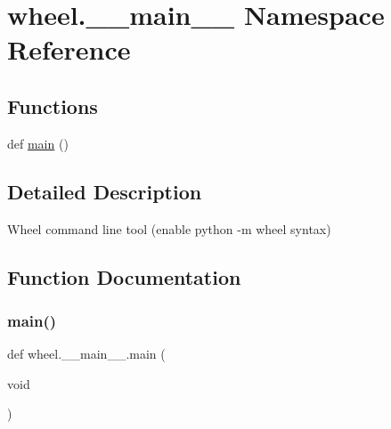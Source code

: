 \hypertarget{namespacewheel_1_1____main____}{}\section{wheel.\+\_\+\+\_\+main\+\_\+\+\_\+ Namespace Reference}
\label{namespacewheel_1_1____main____}
\subsection*{Functions}
\begin{DoxyCompactItemize}
\item 
def \hyperlink{namespacewheel_1_1____main_____acbe054767eccd2bd70730f7ba3743019}{main} ()
\end{DoxyCompactItemize}


\subsection{Detailed Description}
\begin{DoxyVerb}Wheel command line tool (enable python -m wheel syntax)
\end{DoxyVerb}
 

\subsection{Function Documentation}
\mbox{\label{namespacewheel_1_1____main_____acbe054767eccd2bd70730f7ba3743019}} 
\subsubsection{\texorpdfstring{main()}{main()}}
{\footnotesize\ttfamily def wheel.\+\_\+\+\_\+main\+\_\+\+\_\+.\+main (\begin{DoxyParamCaption}\item[{void}]{ }\end{DoxyParamCaption})}

